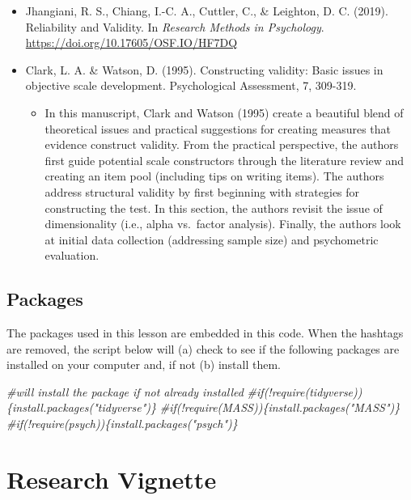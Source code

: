 \documentclass[
  english,
]{book}
\newenvironment{Shaded}{\begin{snugshade}}{\end{snugshade}}
\newcommand{\CommentTok}[1]{\textcolor[rgb]{0.56,0.35,0.01}{\textit{#1}}}
\providecommand{\tightlist}{%
  \setlength{\itemsep}{0pt}\setlength{\parskip}{0pt}}
\begin{document}
\begin{itemize}
\tightlist
\item
  Jhangiani, R. S., Chiang, I.-C. A., Cuttler, C., \& Leighton, D. C. (2019). Reliability and Validity. In \emph{Research Methods in Psychology}. \url{https://doi.org/10.17605/OSF.IO/HF7DQ}
\item
  Clark, L. A. \& Watson, D. (1995). Constructing validity: Basic issues in objective scale development. Psychological Assessment, 7, 309-319.

  \begin{itemize}
  \tightlist
  \item
    In this manuscript, Clark and Watson (1995) create a beautiful blend of theoretical issues and practical suggestions for creating measures that evidence construct validity. From the practical perspective, the authors first guide potential scale constructors through the literature review and creating an item pool (including tips on writing items). The authors address structural validity by first beginning with strategies for constructing the test. In this section, the authors revisit the issue of dimensionality (i.e., alpha vs.~factor analysis). Finally, the authors look at initial data collection (addressing sample size) and psychometric evaluation.
  \end{itemize}
\end{itemize}

\hypertarget{packages-2}{%
\subsection{Packages}\label{packages-2}}

The packages used in this lesson are embedded in this code. When the hashtags are removed, the script below will (a) check to see if the following packages are installed on your computer and, if not (b) install them.

\begin{Shaded}
\begin{Highlighting}[]
\CommentTok{\#will install the package if not already installed}
\CommentTok{\#if(!require(tidyverse))\{install.packages("tidyverse")\}}
\CommentTok{\#if(!require(MASS))\{install.packages("MASS")\}}
\CommentTok{\#if(!require(psych))\{install.packages("psych")\}}
\end{Highlighting}
\end{Shaded}

\hypertarget{research-vignette-1}{%
\section{Research Vignette}\label{research-vignette-1}}
\end{document}
